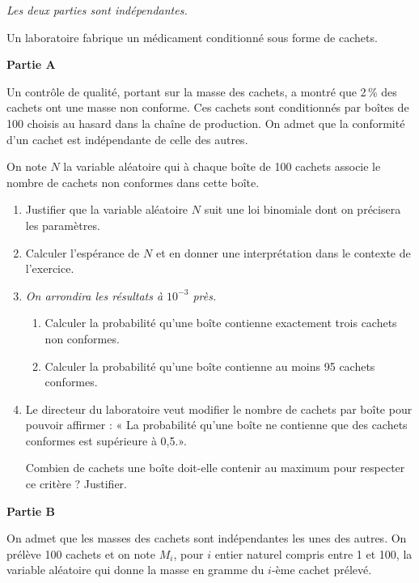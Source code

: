 \textit{Les deux parties sont indépendantes.}

\smallskip

Un laboratoire fabrique un médicament conditionné sous forme de cachets. 

\begin{Centrage}
	\textbf{Partie A}
\end{Centrage}

Un contrôle de qualité, portant sur la masse des cachets, a montré que 2\,\% des cachets ont une masse non conforme. Ces cachets sont conditionnés par boîtes de 100 choisis au hasard dans la chaîne de production. On admet que la conformité d'un cachet est indépendante de celle des autres. 

\smallskip

On note $N$ la variable aléatoire qui à chaque boîte de 100 cachets associe le nombre de cachets non conformes dans cette boîte.

\begin{enumerate}
	\item Justifier que la variable aléatoire $N$ suit une loi binomiale dont on précisera les paramètres.
	\item Calculer l'espérance de $N$ et en donner une interprétation dans le contexte de l'exercice.
	\item \textit{On arrondira les résultats à $10^{-3}$ près.}
	\begin{enumerate}
		\item Calculer la probabilité qu'une boîte contienne exactement trois cachets non
		conformes.
		\item Calculer la probabilité qu'une boîte contienne au moins 95 cachets conformes.
	\end{enumerate}
	\item Le directeur du laboratoire veut modifier le nombre de cachets par boîte pour pouvoir affirmer : « La probabilité qu'une boîte ne contienne que des cachets conformes est supérieure à 0,5.».
	
	Combien de cachets une boîte doit-elle contenir au maximum pour respecter ce critère ? Justifier.
\end{enumerate}

\begin{Centrage}
	\textbf{Partie B}
\end{Centrage}

On admet que les masses des cachets sont indépendantes les unes des autres. On prélève 100 cachets et on note $M_i$, pour $i$ entier naturel compris entre 1 et 100, la variable aléatoire qui donne la masse en gramme du $i$-ème cachet prélevé.

